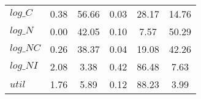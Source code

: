 \begin{center}
\begin{longtable}{lccccc}
$log\_C          $	 & 	        0.38	 & 	       56.66	 & 	        0.03	 & 	       28.17	 & 	       14.76 \\ 
$log\_N          $	 & 	        0.00	 & 	       42.05	 & 	        0.10	 & 	        7.57	 & 	       50.29 \\ 
$log\_NC         $	 & 	        0.26	 & 	       38.37	 & 	        0.04	 & 	       19.08	 & 	       42.26 \\ 
$log\_NI         $	 & 	        2.08	 & 	        3.38	 & 	        0.42	 & 	       86.48	 & 	        7.63 \\ 
${util}          $	 & 	        1.76	 & 	        5.89	 & 	        0.12	 & 	       88.23	 & 	        3.99 \\ 
\end{longtable}
 \end{center}
